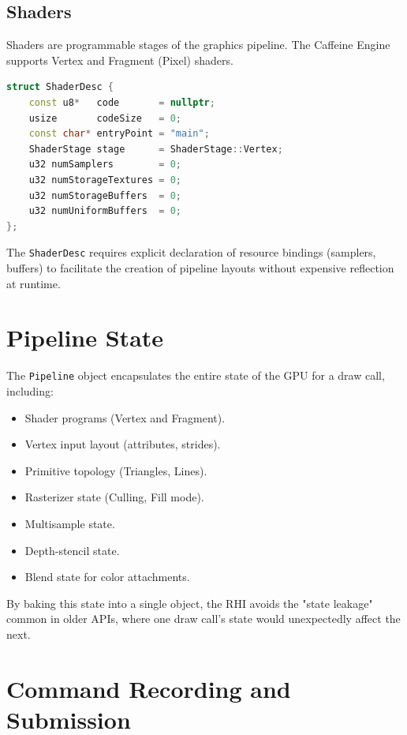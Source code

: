 \subsection{Shaders}

Shaders are programmable stages of the graphics pipeline. The Caffeine Engine supports Vertex and Fragment (Pixel) shaders.

\begin{lstlisting}[language=C++]
struct ShaderDesc {
    const u8*   code       = nullptr;
    usize       codeSize   = 0;
    const char* entryPoint = "main";
    ShaderStage stage      = ShaderStage::Vertex;
    u32 numSamplers        = 0;
    u32 numStorageTextures = 0;
    u32 numStorageBuffers  = 0;
    u32 numUniformBuffers  = 0;
};
\end{lstlisting}

The \texttt{ShaderDesc} requires explicit declaration of resource bindings (samplers, buffers) to facilitate the creation of pipeline layouts without expensive reflection at runtime.

\section{Pipeline State}

The \texttt{Pipeline} object encapsulates the entire state of the GPU for a draw call, including:
\begin{itemize}
    \item Shader programs (Vertex and Fragment).
    \item Vertex input layout (attributes, strides).
    \item Primitive topology (Triangles, Lines).
    \item Rasterizer state (Culling, Fill mode).
    \item Multisample state.
    \item Depth-stencil state.
    \item Blend state for color attachments.
\end{itemize}
By baking this state into a single object, the RHI avoids the "state leakage" common in older APIs, where one draw call's state would unexpectedly affect the next.

\section{Command Recording and Submission}

